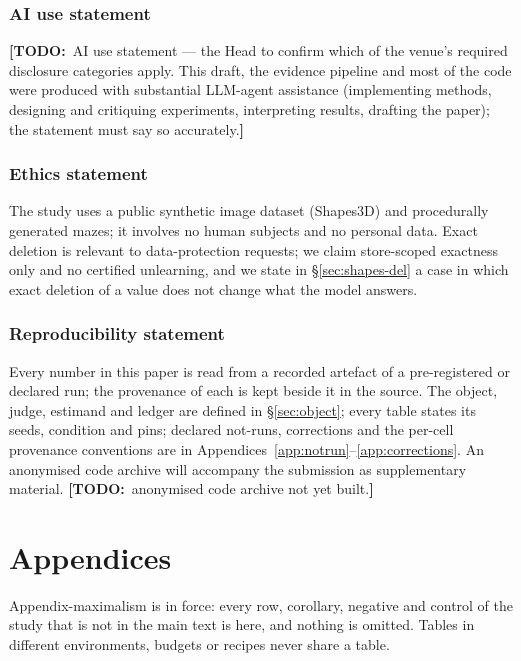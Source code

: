 \documentclass{article} %
\newcommand{\TODO}[1]{{\color{orange}\textbf{[TODO:}~#1\textbf{]}}}
\begin{document}
\subsubsection*{AI use statement}
\TODO{AI use statement --- the Head to confirm which of the venue's required disclosure categories
apply. This draft, the evidence pipeline and most of the code were produced with substantial LLM-agent
assistance (implementing methods, designing and critiquing experiments, interpreting results,
drafting the paper); the statement must say so accurately.}

\subsubsection*{Ethics statement}
The study uses a public synthetic image dataset (Shapes3D) and procedurally generated mazes; it
involves no human subjects and no personal data. Exact deletion is relevant to data-protection
requests; we claim store-scoped exactness only and no certified unlearning, and we state in
\S\ref{sec:shapes-del} a case in which exact deletion of a value does not change what the model
answers.

\subsubsection*{Reproducibility statement}
Every number in this paper is read from a recorded artefact of a pre-registered or declared run;
the provenance of each is kept beside it in the source. The object, judge, estimand and ledger are
defined in \S\ref{sec:object}; every table states its seeds, condition and pins; declared
not-runs, corrections and the per-cell provenance conventions are in
Appendices~\ref{app:notrun}--\ref{app:corrections}. An anonymised code archive will accompany the
submission as supplementary material. \TODO{anonymised code archive not yet built.}


\clearpage
\appendix
\section*{Appendices}
Appendix-maximalism is in force: every row, corollary, negative and control of the study that
is not in the main text is here, and nothing is omitted. Tables in different environments,
budgets or recipes never share a table.
\end{document}
